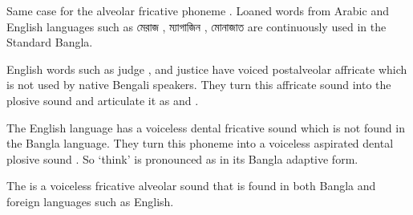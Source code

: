 \begin{table}[!htbp]
    \centering
    \caption{Transcription of foreign words.}
\end{table}

Same case for the alveolar fricative phoneme . Loaned words from Arabic and English languages such as \textbengali{মেরাজ} , \textbengali{ম্যাগাজিন} , \textbengali{মোনাজাত}  are continuously used in the Standard Bangla.

\vspace{5mm}

English words such as judge , and justice  have voiced postalveolar affricate  which is not used by native Bengali speakers. They turn this affricate sound into the plosive sound  and articulate it as  and .

\vspace{5mm}

The English language has a voiceless dental fricative sound  which is not found in the Bangla language. They turn this phoneme into a voiceless aspirated dental plosive sound . So ‘think’ is pronounced as  in its Bangla adaptive form.

\begin{table}[!htbp]
    \centering
    \caption{Transcription of foreign words.}
\end{table}

The  is a voiceless fricative alveolar sound that is found in both Bangla and foreign languages such as English. 



